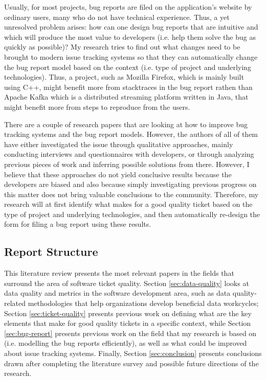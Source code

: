 \documentclass[11pt,english,twocolumn]{article}
\begin{document}
Usually, for most projects, bug reports are filed on the application's website by ordinary users, many
who do not have technical experience. Thus, a yet unresolved problem arises: how can one
design bug reports that are intuitive and which will produce the most value to developers 
(i.e. help them solve the bug as quickly as possible)? My research tries to find out
what changes need to be brought to modern issue tracking systems so that they can automatically
change the bug report model based on the context (i.e. type of project and underlying technologies).
Thus, a project, such as Mozilla Firefox, which is mainly built using C++, might benefit more from
stacktraces in the bug report rathen than Apache Kafka which is a distributed streaming platform written
in Java, that might benefit more from steps to reproduce from the users.

There are a couple of research papers that are looking at how to improve bug tracking
systems and the bug report models. However, the authors of all of them have either investigated the issue through
qualitative approaches, mainly conducting interviews and questionnaires with developers,
or through analyzing previous pieces of work and inferring possible solutions from there. However,
I believe that these approaches do not yield conclusive results because the developers are biased and
also because simply investigating previous progress on this matter does not bring valuable 
conclusions to the community. Therefore, my research will at first identify what makes for a 
good quality ticket based on the type of project and underlying technologies, and then automatically
re-design the form for filing a bug report using these results.

\subsection*{Report Structure}
\label{sec:label-subsection}

This literature review presents the most relevant papers in the fields that surround the
area of software ticket quality. Section \ref{sec:data-quality} looks at data quality and 
metrics in the software development area, such as data quality-related methodologies that 
help organizations develop beneficial data workcycles; Section \ref{sec:ticket-quality} presents 
previous work on defining what are the key elements that make for good quality tickets
in a specific context, while Section \ref{sec:bug-report} presents previous work on
the field that my research is based on (i.e. modelling the bug reports efficiently), 
as well as what could be improved about issue tracking systems.
Finally, Section \ref{sec:conclusion} presents conclusions drawn after completing the 
literature survey and possible future directions of the research.
\end{document}
